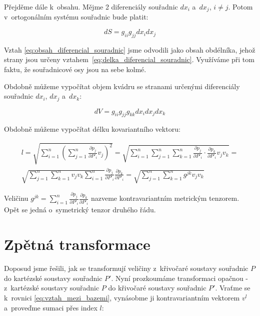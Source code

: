 Přejděme dále k~obsahu. Mějme 2 diferenciály souřadnic \(dx_i\) a~\(dx_j\), \(i \neq j\). Potom v~ortogonálním systému souřadnic bude platit:

\begin{equation}
\label{eq:obsah_diferencial_souradnic}
dS = g_{ii} g_{jj} dx_i dx_j
\end{equation}

Vztah \eqref{eq:obsah_diferencial_souradnic} jsme odvodili jako obsah obdélníka, jehož strany jsou určeny vztahem~\eqref{eq:delka_diferencial_souradnic}. Využíváme při tom faktu, že souřadnicové osy jsou na sebe kolmé.

Obdobně můžeme vypočítat objem kvádru se stranami určenými diferenciály souřadnic \(dx_i\), \(dx_j\) a~\(dx_k\):

\begin{equation}
\label{eq:objem_diferencial_souradnic}
dV = g_{ii} g_{jj} g_{kk} dx_i dx_j dx_k
\end{equation}

Obdobně můžeme vypočítat délku kovariantního vektoru:

\begin{equation}
\begin{split}
l = \sqrt{\sum_{i=1}^n \left(\sum_{j=1}^n \frac{\partial p_j}{\partial P'_i} v_j \right)^2} = \sqrt{\sum_{i=1}^n \sum_{j=1}^n \sum_{k=1}^n \frac{\partial p_j}{\partial P'_i} \cdot \frac{\partial p_k}{\partial P'_i} v_j v_k} = \\
\sqrt{\sum_{j=1}^n \sum_{k=1}^n v_j v_k \sum_{i=1}^n} \frac{\partial p_j}{\partial P'_i} \frac{\partial p_k}{\partial P'_i} = \sqrt{\sum_{j=1}^n \sum_{k=1}^n g^{jk} v_j v_k}
\end{split}
\end{equation}

Veličinu \(g^{jk} = \sum_{i=1}^n \frac{\partial p_j}{\partial P'_i} \frac{\partial p_k}{\partial P'_i}\) nazveme kontravariantním metrickým tenzorem. Opět se jedná o~symetrický tenzor druhého řádu.


\section{Zpětná transformace}

Doposud jsme řešili, jak se transformují veličiny z~křivočaré soustavy souřadnic \(P\) do kartézské soustavy souřadnic \(P'\). Nyní prozkoumáme transformaci opačnou - z~kartézské soustavy souřadnic \(P\) do křivočaré soustavy souřadnic \(P'\).
Vraťme se k~rovnici \eqref{eq:vztah_mezi_bazemi}, vynásobme ji kontravariantním vektorem \(v^l\) a~proveďme sumaci přes index \(l\):
 
